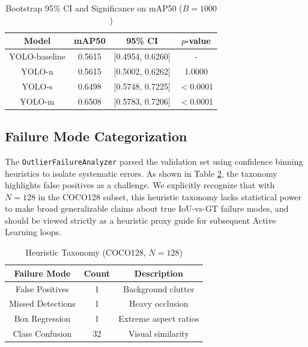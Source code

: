 \documentclass[conference]{IEEEtran}
\begin{document}
\begin{table}[htbp]
\caption{Bootstrap 95\% CI and Significance on mAP50 ($B=1000$)}
\begin{center}
\begin{tabular}{|c|c|c|c|}
\hline
\textbf{Model} & \textbf{mAP50} & \textbf{95\% CI} & \textbf{$p$-value} \\
\hline
YOLO-baseline & 0.5615 & [0.4954, 0.6260] & - \\
YOLO-n & 0.5615 & [0.5002, 0.6262] & 1.0000 \\
YOLO-s & 0.6498 & [0.5748, 0.7225] & $<$0.0001 \\
YOLO-m & 0.6508 & [0.5783, 0.7206] & $<$0.0001 \\
\hline
\end{tabular}
\label{tab:bootstrap}
\end{center}
\end{table}

\subsection{Failure Mode Categorization}
The \texttt{OutlierFailureAnalyzer} parsed the validation set using confidence binning heuristics to isolate systematic errors. As shown in Table \ref{tab:failure}, the taxonomy highlights false positives as a challenge. We explicitly recognize that with $N=128$ in the COCO128 subset, this heuristic taxonomy lacks statistical power to make broad generalizable claims about true IoU-vs-GT failure modes, and should be viewed strictly as a heuristic proxy guide for subsequent Active Learning loops.

\begin{table}[htbp]
\caption{Heuristic Taxonomy (COCO128, $N=128$)}
\begin{center}
\begin{tabular}{|c|c|c|}
\hline
\textbf{Failure Mode} & \textbf{Count} & \textbf{Description} \\
\hline
False Positives & 1 & Background clutter \\
Missed Detections & 1 & Heavy occlusion \\
Box Regression & 1 & Extreme aspect ratios \\
Class Confusion & 32 & Visual similarity \\
\hline
\end{tabular}
\label{tab:failure}
\end{center}
\end{table}
\end{document}
